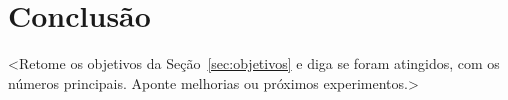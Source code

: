 \chapter{Conclusão}
\label{cap:conclusao}

<Retome os objetivos da Seção~\ref{sec:objetivos} e diga se foram
atingidos, com os números principais. Aponte melhorias ou próximos
experimentos.>
